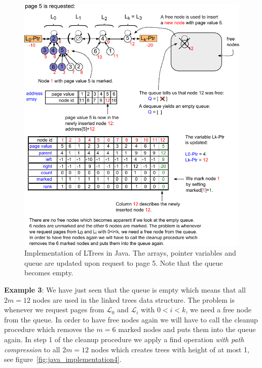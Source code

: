 \documentclass[a4paper,12pt, titlepage]{article}  %
\newcommand{\cl}{\mathcal{L}}   %
\begin{document}
\begin{figure}[htp]
	\centering
	\includegraphics[scale=0.95]{./figures/java_implementation3.pdf}
	\caption{Implementation of LTrees in Java. The arrays, pointer variables and queue are updated upon request to page 5.
                    Note that the queue becomes empty.} 
	\label{fig:java_implementation3}
\end{figure}
 
\noindent \textbf{Example 3}: We have just seen that the queue is empty which means that all $2m=12$ nodes
are used in the linked trees data structure. The problem is whenever we request pages from $\cl_0$ and $\cl_i$ with $0<i<k$, 
we need a free node from the queue. In order to have free nodes again we will have to call the cleanup procedure which 
removes the $m=6$ marked nodes and puts them into the queue again. In step 1 of the cleanup procedure we apply a
find operation \emph{with path compression} to all $2m=12$ nodes which creates trees with height of at most 1, see figure~\ref{fig:java_implementation4}.
\end{document}

